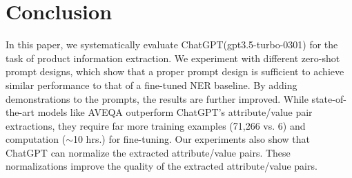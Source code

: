 \section{Conclusion}
\label{sec:conclusion}

In this paper, we systematically evaluate ChatGPT(gpt3.5-turbo-0301) for the task of product information extraction. We experiment with different zero-shot prompt designs, which show that a proper prompt design is sufficient to achieve similar performance to that of a fine-tuned NER baseline.
By adding demonstrations to the prompts, the results are further improved.
While state-of-the-art models like AVEQA outperform ChatGPT's attribute/value pair extractions, they require far more training examples (71,266 vs. 6) and computation ($\sim$10 hrs.) for fine-tuning.
Our experiments also show that ChatGPT can normalize the extracted attribute/value pairs. These normalizations improve the quality of the extracted attribute/value pairs.
